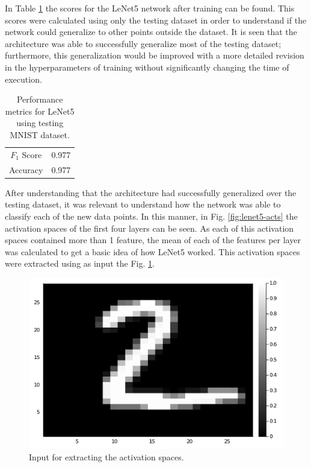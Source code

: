 \documentclass[conference]{IEEEtran}
\theoremstyle{definition}
\theoremstyle{remark}
\theoremstyle{remark}
\begin{document}
In Table \ref{tab:scores} the scores for the LeNet5 network after training can
be found. This scores were calculated using only the testing dataset in order to
understand if the network could generalize to other points outside the dataset.
It is seen that the architecture was able to successfully generalize most of the
testing dataset; furthermore, this generalization would be improved with a more
detailed revision in the hyperparameters of training without significantly
changing the time of execution.

\begin{table}
  \centering
  \begin{tabular}{cc}
    \hline
    $F_1$ Score & 0.977 \\
    Accuracy    & 0.977 \\ \hline
  \end{tabular}
  \caption{Performance metrics for LeNet5 using testing MNIST dataset.}
  \label{tab:scores}
\end{table}

After understanding that the architecture had successfully generalized over the
testing dataset, it was relevant to understand how the network was able to
classify each of the new data points. In this manner, in Fig.
\ref{fig:lenet5-acts} the activation spaces of the first four layers can be
seen. As each of this activation spaces contained more than 1 feature, the mean
of each of the features per layer was calculated to get a basic idea of how
LeNet5 worked. This activation spaces were extracted using as input the Fig.
\ref{fig:input-act}.

\begin{figure}
  \centering \includegraphics[width=\columnwidth]{figs/input-act-space.pdf}
  \caption{Input for extracting the activation spaces.}
  \label{fig:input-act}
\end{figure}
\end{document}
